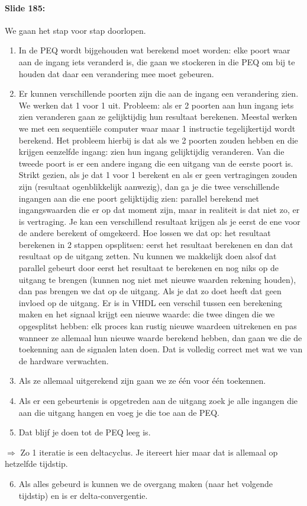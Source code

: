 \documentclass[10pt,a4paper]{book}
\begin{document}
\paragraph{Slide 185:} We gaan het stap voor stap doorlopen.
\begin{enumerate}
\item In de PEQ wordt bijgehouden wat berekend moet worden: elke poort waar aan de ingang iets veranderd is, die gaan we stockeren in die PEQ om bij te houden dat daar een verandering mee moet gebeuren.

\item Er kunnen verschillende poorten zijn die aan de ingang een verandering zien. We werken dat 1 voor 1 uit. Probleem: als er 2 poorten aan hun ingang iets zien veranderen gaan ze gelijktijdig hun resultaat berekenen. Meestal werken we met een sequenti\"ele computer waar maar 1 instructie tegelijkertijd wordt berekend. Het probleem hierbij is dat als we 2 poorten zouden hebben en die krijgen eenzelfde ingang: zien hun ingang gelijktijdig veranderen. Van die tweede poort is er een andere ingang die een uitgang van de eerste poort is. Strikt gezien, als je dat 1 voor 1 berekent en als er geen vertragingen zouden zijn (resultaat ogenblikkelijk aanwezig), dan ga je die twee verschillende ingangen aan die ene poort gelijktijdig zien: parallel berekend met ingangswaarden die er op dat moment zijn, maar in realiteit is dat niet zo, er is vertraging. Je kan een verschillend resultaat krijgen als je eerst de ene voor de andere berekent of omgekeerd. Hoe lossen we dat op: het resultaat berekenen in 2 stappen opsplitsen: eerst het resultaat berekenen en dan dat resultaat op de uitgang zetten. Nu kunnen we makkelijk doen alsof dat parallel gebeurt door eerst het resultaat te berekenen en nog niks op de uitgang te brengen (kunnen nog niet met nieuwe waarden rekening houden), dan pas brengen we dat op de uitgang. Als je dat zo doet heeft dat geen invloed op de uitgang. Er is in VHDL een verschil tussen een berekening maken en het signaal krijgt een nieuwe waarde: die twee dingen die we opgesplitst hebben: elk proces kan rustig nieuwe waardeen uitrekenen en pas wanneer ze allemaal hun nieuwe waarde berekend hebben, dan gaan we die de toekenning aan de signalen laten doen. Dat is volledig correct met wat we van de hardware verwachten.
\item Als ze allemaal uitgerekend zijn gaan we ze \'e\'en voor \'e\'en toekennen.
\item Als er een gebeurtenis is opgetreden aan de uitgang zoek je alle ingangen die aan die uitgang hangen en voeg je die toe aan de PEQ.
\item Dat blijf je doen tot de PEQ leeg is.
\end{enumerate} 	
$\Rightarrow$ Zo 1 iteratie is een deltacyclus. Je itereert hier maar dat is allemaal op hetzelfde tijdstip.	
\begin{enumerate}
\setcounter{enumi}{5}
\item Als alles gebeurd is kunnen we de overgang maken (naar het volgende tijdstip) en is er delta-convergentie.
\end{enumerate}
\end{document}
